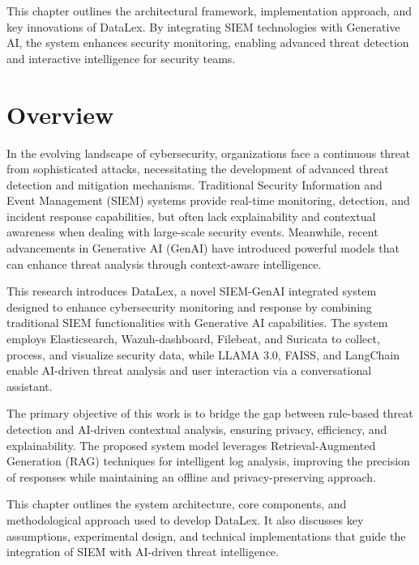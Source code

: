 This chapter outlines the architectural framework, implementation approach, and key innovations of DataLex. By integrating SIEM technologies with Generative AI, the system enhances security monitoring, enabling advanced threat detection and interactive intelligence for security teams.

\section{Overview}
\label{sec_overview}

In the evolving landscape of cybersecurity, organizations face a continuous threat from sophisticated attacks, necessitating the development of advanced threat detection and mitigation mechanisms. Traditional Security Information and Event Management (SIEM) systems provide real-time monitoring, detection, and incident response capabilities, but often lack explainability and contextual awareness when dealing with large-scale security events. Meanwhile, recent advancements in Generative AI (GenAI) have introduced powerful models that can enhance threat analysis through context-aware intelligence.

This research introduces DataLex, a novel SIEM-GenAI integrated system designed to enhance cybersecurity monitoring and response by combining traditional SIEM functionalities with Generative AI capabilities. The system employs Elasticsearch, Wazuh-dashboard, Filebeat, and Suricata to collect, process, and visualize security data, while LLAMA 3.0, FAISS, and LangChain enable AI-driven threat analysis and user interaction via a conversational assistant.

The primary objective of this work is to bridge the gap between rule-based threat detection and AI-driven contextual analysis, ensuring privacy, efficiency, and explainability. The proposed system model leverages Retrieval-Augmented Generation (RAG) techniques for intelligent log analysis, improving the precision of responses while maintaining an offline and privacy-preserving approach.

This chapter outlines the system architecture, core components, and methodological approach used to develop DataLex. It also discusses key assumptions, experimental design, and technical implementations that guide the integration of SIEM with AI-driven threat intelligence.
